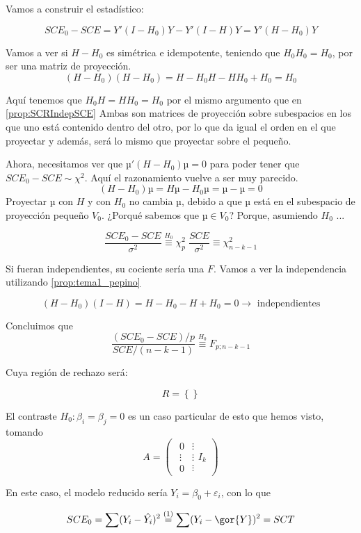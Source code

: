Vamos a construir el estadístico:

\[
SCE_0 - SCE = Y'(I-H_0)Y - Y'(I-H)Y = Y'(H-H_0)Y
\]

Vamos a ver si $H-H_0$ es simétrica e idempotente, teniendo que $H_0H_0 = H_0$, por ser una matriz de proyección. 
\[
(H-H_0)(H-H_0) = H - H_0H - HH_0 + H_0 = H_0
\]

Aquí tenemos que  $H_0H = HH_0 = H_0$ por el mismo argumento que en \ref{prop:SCRIndepSCE} Ambas son matrices de proyección sobre subespacios en los que uno está contenido dentro del otro, por lo que da igual el orden en el que proyectar y además, será lo mismo que proyectar sobre el pequeño.

Ahora, necesitamos ver que $µ'(H-H_0)µ = 0$ para poder tener que $SCE_0 - SCE \sim \chi^2$. Aquí el razonamiento vuelve a ser muy parecido.
\[(H-H_0)µ = Hµ - H_0µ = µ-µ = 0\]
Proyectar $µ$ con $H$ y con $H_0$ no cambia $µ$, debido a que $µ$ está en el subespacio de proyección pequeño $V_0$. ¿Porqué sabemos que $µ∈V_0$? Porque, asumiendo $H_0$ ...

\[
\frac{SCE_0 - SCE}{σ^2} \overset{H_0}{\equiv}\chi^2_{p}\; \frac{SCE}{σ^2} \equiv \chi^2_{n-k-1}
\]

Si fueran independientes, su cociente sería una $F$. Vamos a ver la independencia utilizando \ref{prop:tema1_pepino}

\[(H-H_0)(I-H) = H-H_0 - H + H_0 = 0\to \text{ independientes}\]

Concluimos que 
\[
\frac{(SCE_0-SCE)/p}{SCE/(n-k-1)} \overset{H_0}{\equiv} F_{p;n-k-1}
\]

Cuya región de rechazo será:

\[
R = \left\{  \right\}
\]

\obs El contraste $H_0: β_i = β_j = 0$ es un caso particular de esto que hemos visto, tomando \[A = \begin{pmatrix} \begin{matrix}0\\\vdots\\0\end{matrix} \begin{matrix}\vdots\\\vdots\\\vdots\end{matrix} I_k \end{pmatrix} \]

En este caso, el modelo reducido sería $Y_i = β_0 + ε_i$, con lo que 

\[SCE_0 = \sum (Y_i-\hat{Y_i})^2 \overset{(1)}{=} \sum(Y_i - \gor{Y})^2=SCT\]

